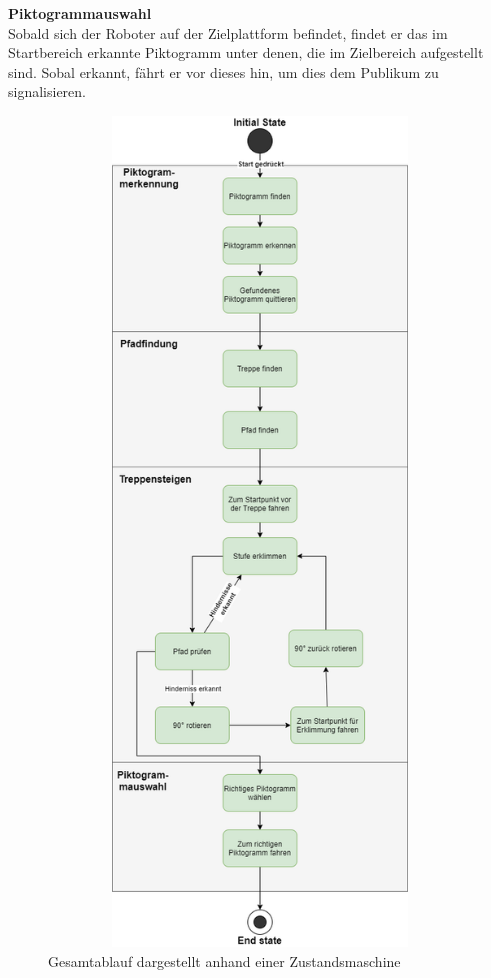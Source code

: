 \textbf{Piktogrammauswahl}\\
Sobald sich der Roboter auf der Zielplattform befindet, findet er das im Startbereich erkannte Piktogramm unter denen, die im Zielbereich aufgestellt sind. Sobal erkannt, fährt er vor dieses hin, um dies dem Publikum zu signalisieren.
\begin{figure}[H]
\begin{center}
    \includegraphics[width=15cm,height=22cm,keepaspectratio]{img/Statemachine.png}
    \caption{Gesamtablauf dargestellt anhand einer Zustandsmaschine}
\end{center}
\end{figure}


